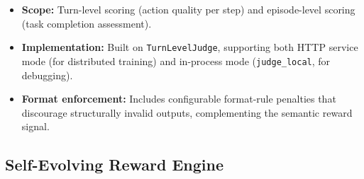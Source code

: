 \begin{itemize}
    \item \textbf{Scope:} Turn-level scoring (action quality per step) and episode-level scoring (task completion assessment).
    \item \textbf{Implementation:} Built on \texttt{TurnLevelJudge}, supporting both HTTP service mode (for distributed training) and in-process mode (\texttt{judge\_local}, for debugging).
    \item \textbf{Format enforcement:} Includes configurable format-rule penalties that discourage structurally invalid outputs, complementing the semantic reward signal.
\end{itemize}
\fi

\subsection{Self-Evolving Reward Engine}
\label{sec:judge}

